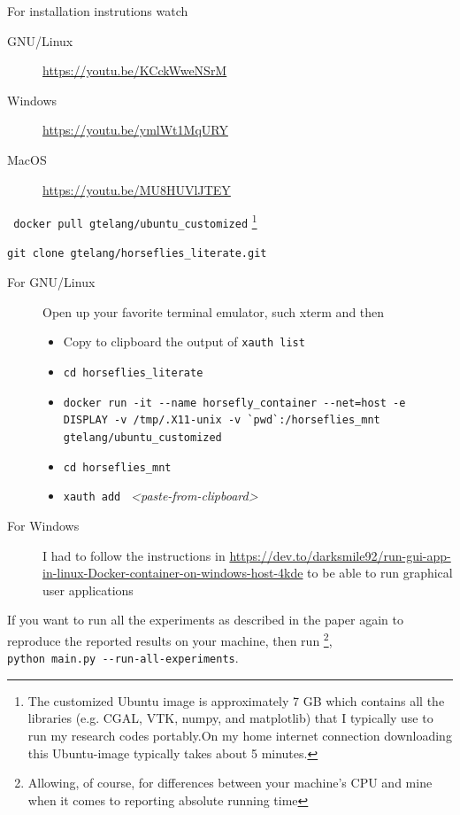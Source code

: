 \documentclass[12pt]{report}
\begin{document}
\begin{alphalist}
\item {} For installation instrutions watch
  \begin{description}
    \item[GNU/Linux]  \url{https://youtu.be/KCckWweNSrM}
    \item[Windows]    \url{https://youtu.be/ymlWt1MqURY}
    \item[MacOS]      \url{https://youtu.be/MU8HUVlJTEY}
  \end{description}

\item {} \verb| docker pull gtelang/ubuntu_customized| \footnote{The customized Ubuntu image is approximately
  7 GB which contains all the libraries (e.g. CGAL, VTK, numpy, and matplotlib) that I typically use to run 
  my research codes portably.On my home internet connection downloading this Ubuntu-image typically takes about 5 minutes. }
\item {} \verb|git clone gtelang/horseflies_literate.git|
\item {} 
\begin{description}
\item[For GNU/Linux] Open up your favorite terminal emulator, such xterm and then
{\small
\begin{itemize}
   \item Copy to clipboard the output of \verb|xauth list|
   \item \verb|cd horseflies_literate|
   \item \verb|docker run -it --name horsefly_container --net=host -e DISPLAY -v /tmp/.X11-unix -v `pwd`:/horseflies_mnt gtelang/ubuntu_customized|
   \item \verb|cd horseflies_mnt| 
   \item \verb|xauth add | \textit{<paste-from-clipboard>}
\end{itemize}}
\item[For Windows] I had to follow the instructions in 
      \url{https://dev.to/darksmile92/run-gui-app-in-linux-Docker-container-on-windows-host-4kde} to be 
      able to run graphical user applications
\end{description}

\item {} If you want to run all the experiments as described in 
  the paper again to reproduce the reported results on your machine, then run \footnote{ Allowing, of course,
  for differences between your machine's CPU and mine when it comes to reporting absolute running time}, \\
  \verb|python main.py --run-all-experiments|. 


\end{alphalist}
\end{document}
